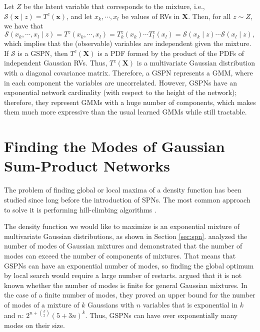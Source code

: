 \documentclass[12pt]{article}
\begin{document}
Let $Z$ be the latent variable that corresponds to the mixture, i.e., $\mathcal{S}(\mathbf{x} \mid z) = T^z(\textbf{x})$, and let $x_k, \cdots, x_l$ be values of RVs in $\mathbf{X}$. Then, for all $z \sim Z$, we have that
\begin{equation}
  \mathcal{S}(x_k, \cdots, x_l \mid z)  =  T^z(x_k, \cdots, x_l) 
  =  T^z_k(x_k) \cdots T^z_l(x_l) %
   =  \mathcal{S}(x_k \mid z) \cdots \mathcal{S}(x_l \mid z),
\end{equation}
which implies that the (observable) variables are independent given the mixture.
If $\mathcal{S}$ is a GSPN, then $T^z(\mathbf{X})$ is a PDF formed by the product of the PDFs of independent Gaussian RVs. Thus, $T^z(\mathbf{X})$ is a multivariate Gaussian distribution with a diagonal covariance matrix. Therefore, a GSPN represents a GMM, where in each component the variables are uncorrelated.
%
However, GSPNs have an exponential network cardinality (with respect to the height of the network); therefore, they represent GMMs with a huge number of components, which makes them much more expressive than the usual learned GMMs while still tractable.

\section{Finding the Modes of Gaussian Sum-Product Networks}
\label{sec:modes}

The problem of finding global or local maxima of a density function has been studied since long before the introduction of SPNs. The most common approach to solve it is performing hill-climbing algorithms \cite{Russell2010, Carreira-Perpinan2000}.

The density function we would like to maximize is an exponential mixture of multivariate Gaussian distributions, as shown in Section \ref{sec:spn}. \cite{Carreira-Perpinan2003, Carreira-Perpinan2003a} analyzed the number of modes of Gaussian mixtures and demonstrated that the number of modes can exceed the number of components of mixtures. That means that GSPNs can have an exponential number of modes, so finding the global optimum by local search would require a large number of restarts.
%
\cite{Amendola2019} argued that it is not known whether the number of modes is finite for general Gaussian mixtures. In the case of a finite number of modes, they proved an upper bound for the number of modes of a mixture of $k$ Gaussians with $n$ variables that is exponential in $k$ and $n$: $2^{n+\binom{k}{2}}(5+3n)^k$. Thus, GSPNs can have over exponentially many modes on their size.
\end{document}
